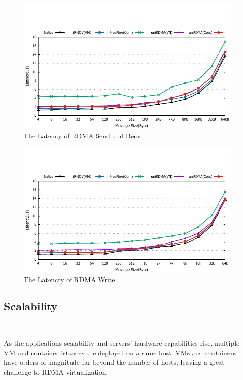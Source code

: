 \begin{figure}[!ht]
	\centering
	\includegraphics[width=1.0\linewidth]{images/send-lat.pdf}
	\caption{The Latency of RDMA Send and Recv}
	\label{fig:send-lat}
\end{figure}

\begin{figure}[!ht]
	\centering
	\includegraphics[width=1.0\linewidth]{images/write-lat.pdf}
	\caption{The Latencty of RDMA Write}
	\label{fig:write-lat}
\end{figure}

\subsection{Scalability}
\
\noindent

As the applications scalability and servers' hardware capabilities rise, multiple VM and container istances are deployed on a same host. VMs and containers have orders of magnitude far beyond the number of hosts, leaving a great challenge to RDMA virtualization. 

